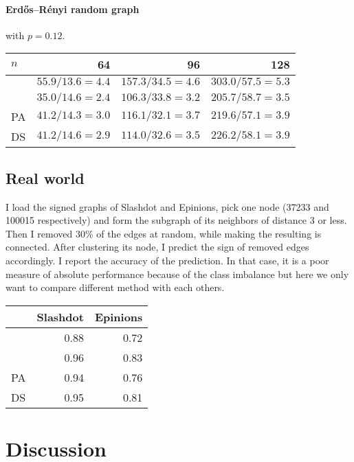 \paragraph{Erdős–Rényi random graph} \autocites{Gilbert1959}{ErdosRG59} with
$p=0.12$.

\begin{center}
	\begin{tabular}{lrrr}
		\toprule
		$n$      & 64              & 96               & 128 \\
		\midrule
		\pot{} & $55.9/13.6=4.4$ & $157.3/34.5=4.6$ & $303.0/57.5=5.3$ \\
		\pat{} & $35.0/14.6=2.4$ & $106.3/33.8=3.2$ & $205.7/58.7=3.5$ \\
		PA     & $41.2/14.3=3.0$ & $116.1/32.1=3.7$ & $219.6/57.1=3.9$ \\
		DS     & $41.2/14.6=2.9$ & $114.0/32.6=3.5$ & $226.2/58.1=3.9$ \\
		\bottomrule
	\end{tabular}
\end{center}

\subsection{Real world}
\label{sub:real_world}

I load the signed graphs of Slashdot and Epinions, pick one node (37233 and
100015 respectively) and form the subgraph of its neighbors of distance 3 or
less. Then I removed 30\% of the edges at random, while making the resulting
is connected. After clustering its node, I predict the sign of removed edges
accordingly. I report the accuracy of the prediction. In that case, it is a
poor measure of absolute performance because of the class imbalance but here
we only want to compare different method with each others.

\begin{center}
	\begin{tabular}{lrr}
		\toprule
		& Slashdot & Epinions \\
		\midrule
		\pot{} & 0.88 &	0.72	\\
		\pat{} & 0.96 &	0.83	\\
		PA     & 0.94 &	0.76	\\
		DS     & 0.95 &	0.81	\\
		\bottomrule
	\end{tabular}
\end{center}

\section{Discussion}

